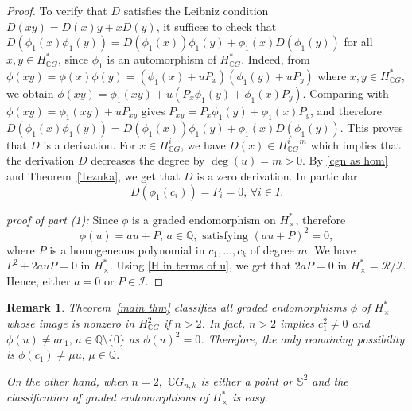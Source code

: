 \documentclass{amsart}
\newtheorem{remark}[theorem]{Remark}
\newcommand{\thmref}[1]{Theorem~\ref{#1}}
\begin{document}
\begin{proof}
		To verify that $D$ satisfies the Leibniz condition $D(xy)=D(x)y+xD(y)$,
		it suffices to check that
		$D(\phi_1(x)\phi_1(y))=D(\phi_1(x))\phi_1(y)+\phi_1(x)D(\phi_1(y))$
		for all $x,y \in H^*_{\mathbb{C}G}$, since $\phi_1$ is an automorphism of $H^*_{\mathbb{C}G}$.
		Indeed, from
		$\phi(xy)=\phi(x)\phi(y)=(\phi_1(x)+uP_x)(\phi_1(y)+uP_y)$ where $x,y\in H^*_{\mathbb CG}$, we obtain
		$\phi(xy)=\phi_1(xy)+u(P_x\phi_1(y)+\phi_1(x)P_y)$.
		Comparing with $\phi(xy)=\phi_1(xy)+uP_{xy}$ gives
		$P_{xy}=P_x\phi_1(y)+\phi_1(x)P_y$, and therefore
		$D(\phi_1(x)\phi_1(y))=D(\phi_1(x))\phi_1(y)+\phi_1(x)D(\phi_1(y))$. \fi
		This proves that $D$ is a derivation. For $x \in H^i_{\mathbb{C}G}$, we have $D(x) \in H^{i-m}_{\mathbb{C}G}$ which implies that the derivation $D$ decreases the degree by $\deg(u)=m>0$. By \eqref{cgn as hom} and \thmref{Tezuka}, we get that $D$ is a zero derivation. In particular $$D(\phi_1(c_i))=P_i=0, \, \forall i \in I.$$
		
		\textit{proof of part (1):} Since $\phi$ is a graded endomorphism on $H^*_{\times}$, therefore $$\phi(u) = a u + P, \, a \in \mathbb{Q}, \text{ satisfying } (a u + P)^2 =0,$$ where $P$ is a homogeneous polynomial in $c_1, \dots, c_k$ of degree $m$. We have $P^2 + 2 a u P =0$ in $H^*_{\times}$. Using \eqref{H in terms of u}, we get that $2aP =0$ in $H^*_{\times}=\mathcal{R}/\mathcal{I}$. Hence, either $a=0$ or $P\in \mathcal{I}$.
	\end{proof}
	
	
		\begin{remark}
			\thmref{main thm} classifies all graded endomorphisms $\phi$ of $H^*_\times$ whose image is nonzero in $H^2_{\mathbb CG}$ if $n>2$. In fact, $n>2$ implies $c_1^2\neq 0$ and $\phi(u) \neq ac_1,\, a \in \mathbb{Q}\setminus\{0\}$ as $\phi(u)^2=0$. Therefore, the only remaining possibility is $\phi(c_1)\neq \mu u,\, \mu \in \mathbb Q.$ 
			
			On the other hand, when $n=2,$ $\mathbb CG_{n,k}$ is either a point or $\mathbb S^2$ and the classification of graded endomorphisms of $H^*_\times$ is easy.
		\end{remark}
	
\end{document}

